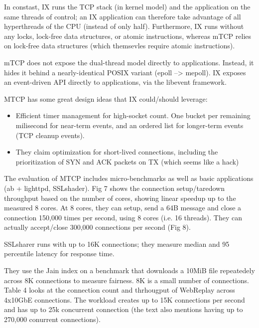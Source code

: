 In constast, IX runs the TCP stack (in kernel model) and the
application on the same threads of control; an IX application can
therefore take advantage of all hyperthreads of the CPU (instead of
only half).  Furthermore, IX runs without any locks, lock-free data
structures, or atomic instructions, whereas mTCP relies on lock-free
data structures (which themsevles require atomic instructions).

mTCP does not expose the dual-thread model directly to
applications. Instead, it hides it behind a nearly-identical POSIX
variant (epoll --> mepoll).  IX exposes an event-driven API directly
to applications, via the libevent framework.

MTCP has some great design ideas that IX could/should leverage:

\begin{itemize}

\item Efficient timer management for high-socket count.  One bucket
  per remaining milisecond for near-term events, and an ordered list
  for longer-term events (TCP cleanup events).

\item They claim optimization for
short-lived connections, including the prioritization of SYN and ACK
packets on TX (which seems like a hack)

\end{itemize}

The evaluation of MTCP includes micro-benchmarks as well as basic
applications (ab + lighttpd, SSLshader).  Fig 7 shows the connection
setup/taredown throughput based on the number of cores, showing linear
speedup up to the measured 8 cores.  At 8 cores, they can setup, send
a 64B message and close a connection 150,000 times per second, using 8
cores (i.e. 16 threads).  They can actually accept/close 300,000
connections per second (Fig 8).

SSLsharer runs with up to 16K connections; they measure median and 95
percentile latency for response time.

They use the Jain index on a benchmark that downloads a 10MiB file
repeatedely across 8K connections to measure fairness.  8K is a small
number of connections.  Table 4 looks at the connection count and
thrhougput of WebReplay across 4x10GbE connections.  The workload
creates up to 15K connections per second and has up to 25k concurrent
connection (the text also mentions having up to 270,000 conurrent
connections).




